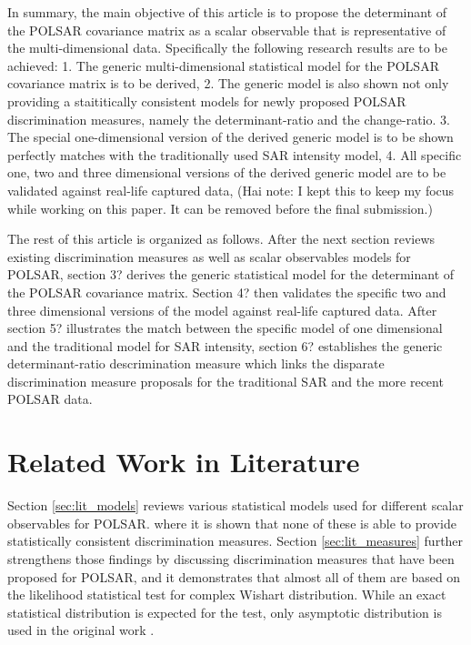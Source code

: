 \documentclass[journal]{IEEEtran}
\begin{document}
In summary, the main objective of this article is to propose the determinant of the POLSAR covariance matrix as a scalar observable
  that is representative of the multi-dimensional data.
Specifically the following research results are to be achieved:
  1. The generic multi-dimensional statistical model for the POLSAR covariance matrix is to be derived, 
  2. The generic model is also shown not only providing a staititically consistent models for newly proposed POLSAR discrimination measures, namely the determinant-ratio and the change-ratio.
  3. The special one-dimensional version of the derived generic model is to be shown perfectly matches with the traditionally used SAR intensity model,
  4. All specific one, two and three dimensional versions of the derived generic model are to be validated against real-life captured data,
(Hai note: I kept this to keep my focus while working on this paper.
  It can be removed before the final submission.)
  
The rest of this article is organized as follows.
After the next section reviews existing discrimination measures as well as scalar observables models for POLSAR,
  section 3? derives the generic statistical model for the determinant of the POLSAR covariance matrix.
Section 4? then validates the specific two and three dimensional versions of the model against real-life captured data.
After section 5? illustrates the match between the specific model of one dimensional and the traditional model for SAR intensity,
  section 6? establishes the generic determinant-ratio descrimination measure which links the disparate discrimination measure proposals for the traditional SAR and the more recent POLSAR data.

\section{Related Work in Literature}
\label{sec:lit_review}

Section \ref{sec:lit_models} reviews various statistical models used for different scalar observables for POLSAR.
  where it is shown that none of these is able to provide statistically consistent discrimination measures. 
Section \ref{sec:lit_measures} further strengthens those findings by discussing discrimination measures that have been proposed for POLSAR,
  and it demonstrates that almost all of them are based on the likelihood statistical test for complex Wishart distribution.
While an exact statistical distribution is expected for the test,
  only asymptotic distribution is used in the original work \cite{Conradsen_2003_TGRS_4}.
  
\end{document}
